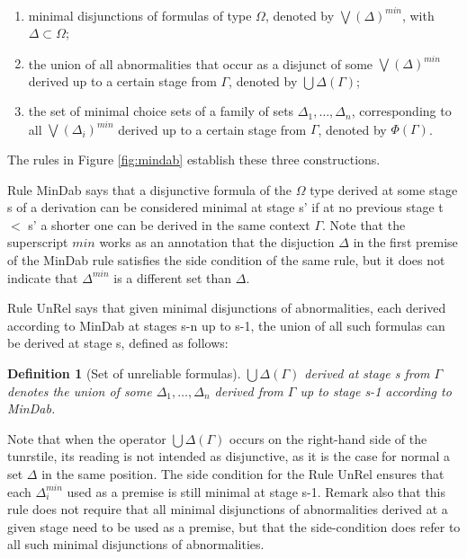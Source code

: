 \documentclass[]{article}
\newtheorem{definition}{Definition}
\begin{document}
\begin{enumerate}
\item  minimal disjunctions of formulas of type $\Omega$, denoted by $\bigvee(\Delta)^{min}$, with $\Delta \subset \Omega$;
\item the union of all abnormalities that occur as a disjunct of some $\bigvee(\Delta)^{min}$ derived up to a certain stage from $\Gamma$, denoted by $\bigcup\Delta(\Gamma)$;
\item the set of minimal choice sets of a family of sets $\Delta_1, \ldots, \Delta_n$, corresponding to all $\bigvee(\Delta_i)^{min}$ derived up to a certain stage from $\Gamma$, denoted by $\Phi(\Gamma)$.
\end{enumerate}

The rules in Figure \ref{fig:mindab} establish these three constructions.

Rule {\sf MinDab} says that a disjunctive formula of the $\Omega$ type derived at some stage {\sf s} of a derivation can be considered minimal at stage {\sf s'} if at no previous stage {\sf t} $<$ {\sf s'} a shorter one can be derived in the same context $\Gamma$. Note that the superscript $min$ works as an annotation that the disjuction $\Delta$ in the first premise of the {\sf MinDab} rule satisfies the side condition of the same rule, but it does not indicate that $\Delta^{min}$ is a different set than $\Delta$.

Rule {\sf UnRel} says that given minimal disjunctions of abnormalities, each derived according to {\sf MinDab} at stages {\sf s-n} up to {\sf s-1}, the union of all such formulas can be derived at stage {\sf s}, defined as follows:

\begin{definition}[Set of unreliable formulas]
$\bigcup\Delta(\Gamma)$ derived at stage {\sf s} from $\Gamma$ denotes the union of some $\Delta_{1}, \dots, \Delta_{n}$ derived from $\Gamma$ up to stage {\sf s-1} according to {\sf MinDab}.
\end{definition}
Note that when the operator $\bigcup\Delta(\Gamma)$ occurs on the right-hand side of the tunrstile, its reading is not intended as disjunctive, as it is the case for normal a set $\Delta$ in the same position. The side condition for the Rule {\sf UnRel} ensures that each $\Delta_{i}^{min}$ used as a premise is still minimal at stage {\sf s-1}. Remark also that this rule does not require that all minimal disjunctions of abnormalities derived at a given stage need to be used as a premise, but that the side-condition does refer to all such minimal disjunctions of abnormalities.
\end{document}
